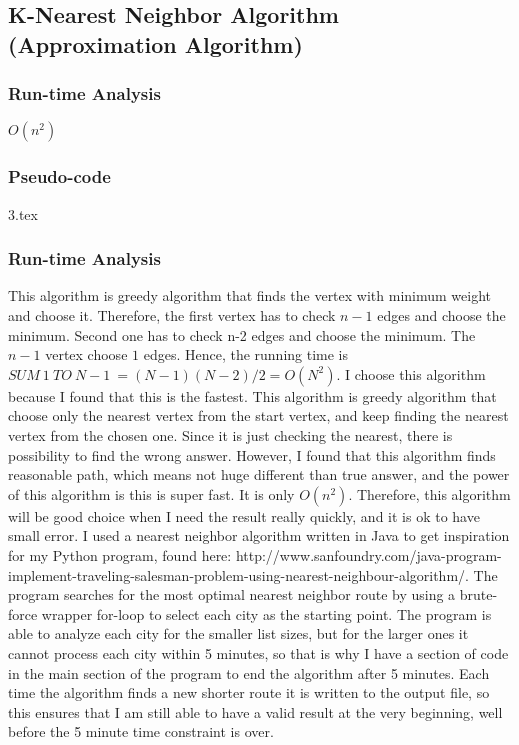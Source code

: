 \documentclass[onecolumn, draftclsnofoot,10pt, compsoc]{IEEEtran}
\begin{document}
\newpage
\subsection{K-Nearest Neighbor Algorithm (Approximation Algorithm)}
\subsubsection{Run-time Analysis}
$O(n^2)$
\subsubsection{Pseudo-code}
{3.tex}

\subsubsection{Run-time Analysis}
This algorithm is greedy algorithm that finds the vertex with minimum weight and choose it. Therefore, the first vertex has to check $n-1$ edges and choose the minimum. Second one has to check n-2 edges and choose the minimum. The $n-1$ vertex choose $1$ edges. Hence, the running time is $SUM\ 1\ TO\ N-1\ = (N-1)(N-2)/2 = O(N^2)$. I choose this algorithm because I found that this is the fastest. This algorithm is greedy algorithm that choose only the nearest vertex from the start vertex, and keep finding the nearest vertex from the chosen one. Since it is just checking the nearest, there is possibility to find the wrong answer. However, I found that this algorithm finds reasonable path, which means not huge different than true answer, and the power of this algorithm is this is super fast. It is only $O(n^2)$. Therefore, this algorithm will be good choice when I need the result really quickly, and
it is ok to have small error. I used a nearest neighbor algorithm written in Java to get inspiration for my Python program,
found here: http://www.sanfoundry.com/java-program-implement-traveling-salesman-problem-using-nearest-neighbour-algorithm/. The program searches for the most optimal nearest neighbor route by using a brute-force wrapper for-loop to select each city as the starting point. The program is able to analyze each
city for the smaller list sizes, but for the larger ones it cannot process each city within 5 minutes, so that is why I have a section of code in the main section of the program to end the algorithm after 5 minutes. Each time the algorithm finds a new shorter route it is written to the output file, so this ensures that I am still able to have a valid result at the very beginning, well before the 5 minute time constraint is over.
\end{document}
